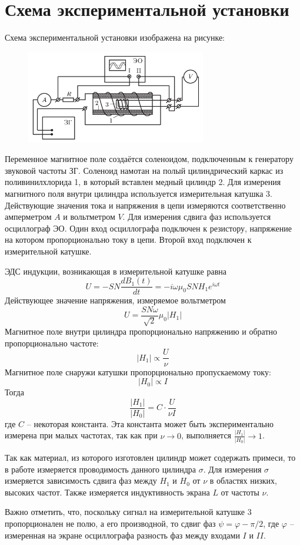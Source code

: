 \section*{Схема экспериментальной установки}

Схема экспериментальной установки изображена на рисунке:

\begin{figure}[H]
	\centering
	\includegraphics[width=0.7\textwidth]{../res/exp scheme.png}
\end{figure}

Переменное магнитное поле создаётся соленоидом, подключенным к генератору звуковой частоты ЗГ. Соленоид намотан на полый цилиндрический каркас из поливинилхлорида 1, в который вставлен медный цилиндр 2. Для измерения магнитного поля внутри цилиндра используется измерительная катушка 3. Действующие значения тока и напряжения в цепи измеряются соответственно амперметром $A$ и вольтметром $V$. Для измерения сдвига фаз используется осциллограф ЭО. Один вход осциллографа подключен к резистору, напряжение на котором пропорционально току в цепи. Второй вход подключен к измерительной катушке.

ЭДС индукции, возникающая в измерительной катушке равна
$$
U = - SN \frac{dB_1(t)}{dt} = -i \omega \mu_0 SN H_1 e^{i\omega t}
$$
Действующее значение напряжения, измеряемое вольтметром
$$
U = \frac{SN \omega}{\sqrt{2}} \mu_0 |H_1|
$$
Магнитное поле внутри цилиндра пропорционально напряжению и обратно пропорционально частоте:
$$
|H_1| \propto \frac{U}{\nu}
$$
Магнитное поле снаружи катушки пропорционально пропускаемому току:
$$
|H_0| \propto I
$$
Тогда 
\begin{equation}
	\frac{|H_1|}{|H_0|} = C \cdot \frac{U}{\nu I}
	\label{eq:UInu}
\end{equation}
где $C$ -- некоторая константа. Эта константа может быть экспериментально измерена при малых частотах, так как при $\nu \rightarrow 0$, выполняется $\frac{|H_1|}{|H_0|} \rightarrow 1$.

Так как материал, из которого изготовлен цилиндр может содержать примеси, то в работе измеряется проводимость данного цилиндра $\sigma$. Для измерения $\sigma$ измеряется зависимость сдвига фаз между $H_1$ и $H_0$ от $\nu$ в областях низких, высоких частот. Также измеряется индуктивность экрана $L$ от частоты $\nu$.

Важно отметить, что, поскольку сигнал на измерительной катушке 3 пропорционален не полю, а его производной, то сдвиг фаз $\psi = \varphi - \pi/2$, где $\varphi$ -- измеренная на экране осциллографа разность фаз между входами $I$ и $II$.